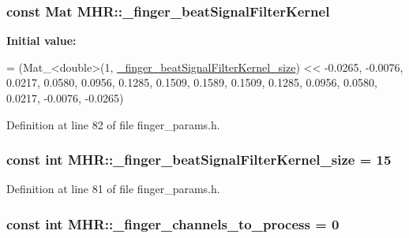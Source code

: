 \hypertarget{namespace_m_h_r_a7c6f13da1b28c69fdd787e07d05c7503}{
\subsubsection[{\+\_\+finger\+\_\+beat\+Signal\+Filter\+Kernel}]{\setlength{\rightskip}{0pt plus 5cm}const Mat M\+H\+R\+::\+\_\+finger\+\_\+beat\+Signal\+Filter\+Kernel}}\label{namespace_m_h_r_a7c6f13da1b28c69fdd787e07d05c7503}
{\bfseries Initial value\+:}
\begin{DoxyCode}
= (Mat\_<double>(1, \hyperlink{namespace_m_h_r_a9b1303d740470ce969352e3173a27ebb}{\_finger\_beatSignalFilterKernel\_size}) <<
                                              -0.0265, -0.0076, 0.0217, 0.0580, 0.0956,
                                              0.1285, 0.1509, 0.1589, 0.1509, 0.1285,
                                              0.0956, 0.0580, 0.0217, -0.0076, -0.0265)
\end{DoxyCode}


Definition at line 82 of file finger\+\_\+params.\+h.

\hypertarget{namespace_m_h_r_a9b1303d740470ce969352e3173a27ebb}{
\subsubsection[{\+\_\+finger\+\_\+beat\+Signal\+Filter\+Kernel\+\_\+size}]{\setlength{\rightskip}{0pt plus 5cm}const int M\+H\+R\+::\+\_\+finger\+\_\+beat\+Signal\+Filter\+Kernel\+\_\+size = 15}}\label{namespace_m_h_r_a9b1303d740470ce969352e3173a27ebb}


Definition at line 81 of file finger\+\_\+params.\+h.

\hypertarget{namespace_m_h_r_a16934905e88de3a2d084e6734948ec65}{
\subsubsection[{\+\_\+finger\+\_\+channels\+\_\+to\+\_\+process}]{\setlength{\rightskip}{0pt plus 5cm}const int M\+H\+R\+::\+\_\+finger\+\_\+channels\+\_\+to\+\_\+process = 0}}\label{namespace_m_h_r_a16934905e88de3a2d084e6734948ec65}


